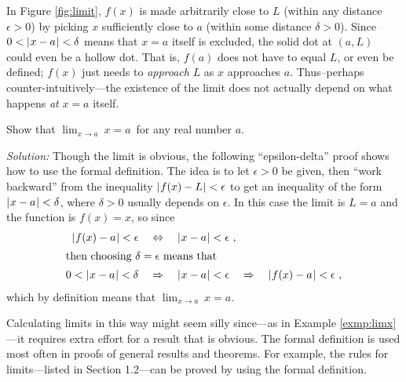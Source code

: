 In Figure \ref{fig:limit}, $f(x)$ is made arbitrarily close to $L$
(within any distance $\epsilon > 0$) by picking $x$ sufficiently close to $a$
(within some distance $\delta > 0$). Since $0 < \lvert\mspace{1mu}x - a\mspace{1mu}\rvert < \delta$ means that
$x = a$ itself is excluded, the solid dot at $(a,L)$ could even be a hollow dot.
That is, $f(a)$ does not have to equal $L$, or even be defined; $f(x)$ just
needs to \emph{approach} $L$ as $x$ approaches $a$. Thus--perhaps
counter-intuitively---the existence of the limit does not actually depend on
what happens \emph{at} $x=a$ itself.
\newpage
\begin{exmp}\label{exmp:limx}
 Show that $\displaystyle\lim_{x \to a} ~x = a\,$ for any real number $a$.\vspace{1mm}
 \par\noindent\emph{Solution:} Though the limit is obvious, the following
``epsilon-delta'' proof shows how to use the formal definition. The idea is to
let $\epsilon > 0$ be given, then ``work backward'' from the inequality
$\lvert\mspace{1mu}f(x)-L\mspace{1mu}\rvert < \epsilon$ to get an inequality of the form $\lvert\mspace{1mu}x-a\mspace{1mu}\rvert < \delta$,
where $\delta > 0$ usually depends on $\epsilon$. In this case the limit is 
$L = a$ and the function is $f(x) = x$, so since
 \begin{align*}
  \lvert\mspace{1mu}f(x)-a\mspace{1mu}\rvert < \epsilon \quad&\Leftrightarrow\quad \lvert\mspace{1mu}x-a\mspace{1mu}\rvert < \epsilon ~,\\
  \intertext{then choosing $\delta = \epsilon$ means that}
  0 < \lvert\mspace{1mu}x-a\mspace{1mu}\rvert < \delta \quad&\Rightarrow\quad \lvert\mspace{1mu}x-a\mspace{1mu}\rvert < \epsilon
  \quad\Rightarrow\quad \lvert\mspace{1mu}f(x)-a\mspace{1mu}\rvert < \epsilon ~,
 \end{align*}
 which by definition means that $\displaystyle\lim_{x \to a} ~x = a$.
\end{exmp}
\divider
\vspace{3mm}

Calculating limits in this way might seem silly since---as in Example
\ref{exmp:limx}---it requires extra effort for a result that is obvious. The
formal definition is used most often in proofs of general results and theorems.
For example, the rules for limits---listed in Section 1.2---can be proved by
using the formal definition.

